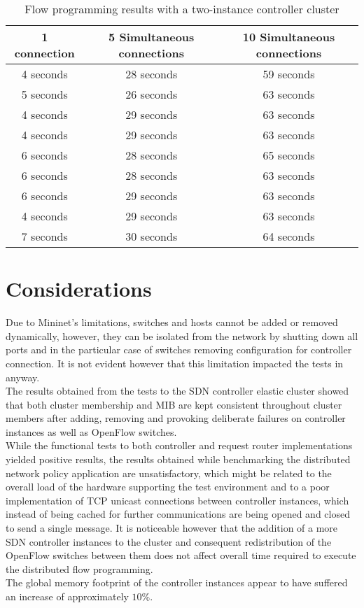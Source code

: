 \begin{table}[h!]
	\begin{center}
		\begin{tabular}{ | c | c | c | }
			\rowcolor{HeaderRowColor}
			\hline
			\textbf{1 connection} & \textbf{5 Simultaneous connections} & \textbf{10 Simultaneous connections}\\
			\hline
			4 seconds & 28 seconds & 59 seconds\\
			\hline
			5 seconds & 26 seconds & 63 seconds\\
			\hline
			4 seconds & 29 seconds & 63 seconds\\
			\hline
			4 seconds & 29 seconds & 63 seconds\\
			\hline
			6 seconds & 28 seconds & 65 seconds\\
			\hline
			6 seconds & 28 seconds & 63 seconds\\
			\hline
			6 seconds & 29 seconds & 63 seconds\\
			\hline
			4 seconds & 29 seconds & 63 seconds\\
			\hline
			7 seconds & 30 seconds & 64 seconds\\
			\hline
		\end{tabular}
		\caption{Flow programming results with a two-instance controller cluster}
		\label{table:perfomance-tests-3controllers}
	\end{center}
\end{table}
%
\section{Considerations}
\label{section:considerations}
Due to Mininet's limitations, switches and hosts cannot be added or removed dynamically, however, they can be isolated from the network by shutting down all ports and in the particular case of switches removing configuration for controller connection.
It is not evident however that this limitation impacted the tests in anyway.\\
%
The results obtained from the tests to the \gls{SDN} controller elastic cluster showed that both cluster membership and \gls{MIB} are kept consistent throughout cluster members after adding, removing and provoking deliberate failures on controller instances as well as OpenFlow switches.\\
While the functional tests to both controller and request router implementations yielded positive results, the results obtained while benchmarking the distributed network policy application are unsatisfactory, which might be related to the overall load of the hardware supporting the test environment and to a poor implementation of \gls{TCP} unicast connections between controller instances, which instead of being cached for further communications are being opened and closed to send a single message. 
It is noticeable however that the addition of a more \gls{SDN} controller instances to the cluster and consequent redistribution of the OpenFlow switches between them does not affect overall time required to execute the distributed flow programming.\\
The global memory footprint of the controller instances appear to have suffered an increase of approximately $10\%$.
 
